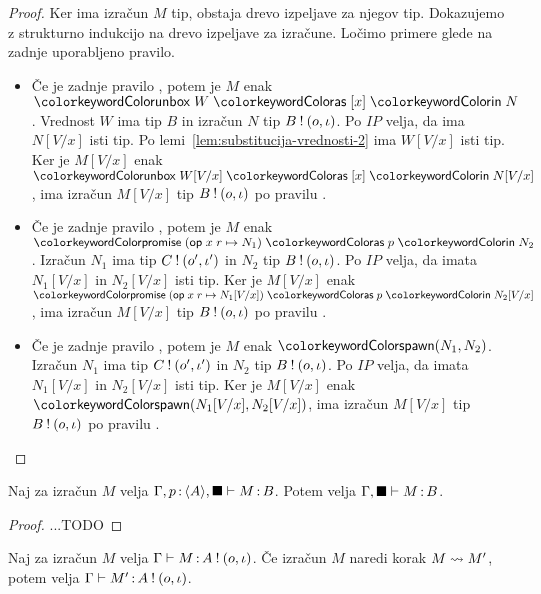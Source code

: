 \begin{proof}
	Ker ima izračun $M$ tip, obstaja drevo izpeljave za njegov tip.
	Dokazujemo z strukturno indukcijo na drevo izpeljave za izračune.
	Ločimo primere glede na zadnje uporabljeno pravilo.
	
	\begin{itemize}
		\item Če je zadnje pravilo , potem je $M$ enak $\tmunbox{W}{x}{N}$. Vrednost $W$ ima tip $B$ in izračun $N$ tip $B \mathbin{!} (o, \iota)$.
		Po $IP$ velja, da ima $N[V/x]$ isti tip. Po lemi~\ref{lem:substitucija-vrednosti-2} ima $W[V/x]$ isti tip. Ker je $M[V/x]$ enak $\tmunbox{W[V/x]}{x}{N[V/x]}$, ima izračun $M[V/x]$ tip $B \mathbin{!} (o, \iota)$ po pravilu .
		
		\item Če je zadnje pravilo , potem je $M$ enak $\tmwithrec{op}{x}{r}{N_1}{p}{N_2}$. Izračun $N_1$ ima tip $C \mathbin{!} (o', \iota')$ in $N_2$ tip $B \mathbin{!} (o, \iota)$.
		Po $IP$ velja, da imata $N_1[V/x]$ in $N_2[V/x]$ isti tip. Ker je $M[V/x]$ enak $\tmwithrec{op}{x}{r}{N_1[V/x]}{p}{N_2[V/x]}$, ima izračun $M[V/x]$ tip $B \mathbin{!} (o, \iota)$ po pravilu .
		
		\item Če je zadnje pravilo , potem je $M$ enak $\tmspawn{N_1}{N_2}$. Izračun $N_1$ ima tip $C \mathbin{!} (o', \iota')$ in $N_2$ tip $B \mathbin{!} (o, \iota)$.
		Po $IP$ velja, da imata $N_1[V/x]$ in $N_2[V/x]$ isti tip. Ker je $M[V/x]$ enak $\tmspawn{N_1[V/x]}{N_2[V/x]}$, ima izračun $M[V/x]$ tip $B \mathbin{!} (o, \iota)$ po pravilu .	
	\end{itemize}
	
\end{proof}

\begin{lema}\label{lem:promise-blackbox}
	Naj za izračun $M$ velja $\Gamma, p \mathinner{:} \langle A \rangle, \blacksquare \vdash M \mathinner{:} B$. Potem velja $\Gamma, \blacksquare \vdash M \mathinner{:} B$.
\end{lema}

\begin{proof}
	...TODO
\end{proof}

\begin{trditev}[o ohranitvi]\label{trd:ohranitev-izracuni-2}
	Naj za izračun $M$ velja $\Gamma \vdash M \mathinner{:} A \mathbin{!} (o, \iota)$. Če izračun $M$ naredi korak $M \leadsto M'$, potem velja $\Gamma \vdash M' \mathinner{:} A \mathbin{!} (o, \iota)$.
\end{trditev}

